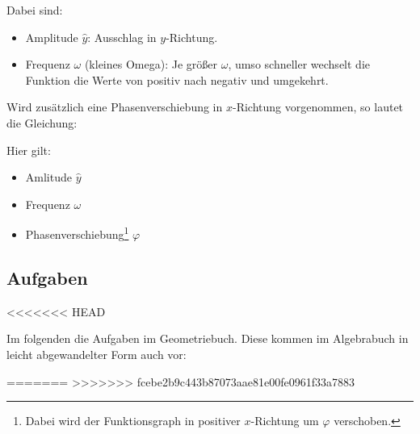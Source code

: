 Dabei sind:
\begin{itemize}

\item
  Amplitude $\hat{y}$: Ausschlag in $y$-Richtung.
\item
  Frequenz $\omega$ (kleines Omega): Je größer $\omega$, umso schneller wechselt die
  Funktion die Werte von positiv nach negativ und umgekehrt.
\end{itemize}

Wird zusätzlich eine Phasenverschiebung in $x$-Richtung vorgenommen, so lautet die Gleichung:

\begin{center}
  \end{center}

Hier gilt:
\begin{itemize}

\item
  Amlitude $\hat{y}$
\item
  Frequenz $\omega$
\item
  Phasenverschiebung\footnote{Dabei wird der Funktionsgraph in positiver $x$-Richtung um
    $\varphi$ verschoben.} $\varphi$
\end{itemize}


\subsection*{Aufgaben}
<<<<<<< HEAD

Im folgenden die Aufgaben im Geometriebuch. Diese kommen im Algebrabuch in leicht abgewandelter Form auch vor:

=======
>>>>>>> fcebe2b9c443b87073aae81e00fe0961f33a7883
